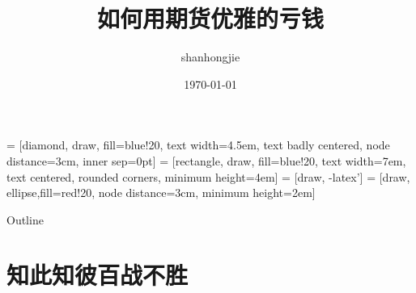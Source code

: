 \documentclass{beamer}
\title[如何用期货优雅的亏钱] %
{如何用期货优雅的亏钱}
\author[shanhongjie] %
{shanhongjie}
\date[Short Occasion] %
{\today}
\begin{document}
 = [diamond, draw, fill=blue!20, 
    text width=4.5em, text badly centered, node distance=3cm, inner sep=0pt]
 = [rectangle, draw, fill=blue!20, 
    text width=7em, text centered, rounded corners, minimum height=4em]
 = [draw, -latex']
 = [draw, ellipse,fill=red!20, node distance=3cm,
    minimum height=2em]

\begin{frame}
  \titlepage
\end{frame}

\begin{frame}{Outline}
  \tableofcontents
\end{frame}





\section{知此知彼百战不胜}
\end{document}
